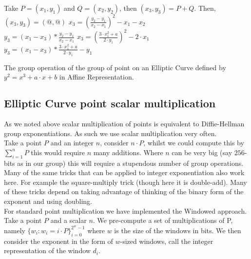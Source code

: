 \documentclass[ %
                    author={Nicholas Tutte},
                supervisor={Prof. Nigel Smart},
                    degree={MEng},
                     title={Secure Two Party Computation},
                  subtitle={A practical comparison of recent protocols},
                      type={Research - GG1K},
                      year={2015} ]{dissertation}
\begin{document}
\begin{appendices}
				\begin{mdframed}
					\begin{algorithm}[H]
						Take $P = (x_1, y_1)$ and $Q = (x_2, y_2)$, then $(x_3, y_3) = P + Q$. Then,\\[0.15cm]
						{
							$(x_3, y_3) = (@, @)$
						}
						{
							{
								$x_3 = (\frac{y_2 - y_1}{x_2 - x_1})^2 - x_1 - x_2$\\
								$y_3 = (x_1 - x_3) * \frac{y_2 - y_1}{x_2 - x_1}$
							}
							{
								$x_3 = (\frac{3\cdot x_1^2 + a}{2 \cdot y_1}) ^ 2 - 2\cdot x_1$\\
								$y_3 = (x_1 - x_3) * \frac{3 \cdot x_1^2 + a}{2 \cdot y_1} - y_1$
							}
						}

						\caption{The group operation of the group of point on an Elliptic Curve defined by $y^2 = x^3 + a \cdot x + b$ in Affine Representation. \label{Algo:ECC_GroupOp}}
					\end{algorithm}
				\end{mdframed}

				\subsection{Elliptic Curve point scalar multiplication}
					As we noted above scalar multiplication of points is equivalent to Diffie-Hellman group exponentiations. As such we use scalar multiplication very often.\\

					Take a point $P$ and an integer $n$, consider $n \cdot P$, whilst we could compute this by $\sum_{i = 1}^{n}P$ this would require $n$ many additions. Where $n$ can be very big (say $256$-bits as in our group) this will require a stupendous number of group operations.\\

					Many of the same tricks that can be applied to integer exponentiation also work here. For example the square-multiply trick (though here it is double-add). Many of these tricks depend on taking advantage of thinking of the binary form of the exponent and using doubling.\\

					For standard point multiplication we have implemented the Windowed approach. Take a point $P$ and a scalar $n$. We pre-compute a set of multiplications of P, namely $\{w_i : w_i = i \cdot P\}_{i = 0}^{2^w - 1}$ where $w$ is the size of the windows in bits. We then consider the exponent in the form of $w$-sized windows, call the integer representation of the window $d_i$.


\end{appendices}
\end{document}
